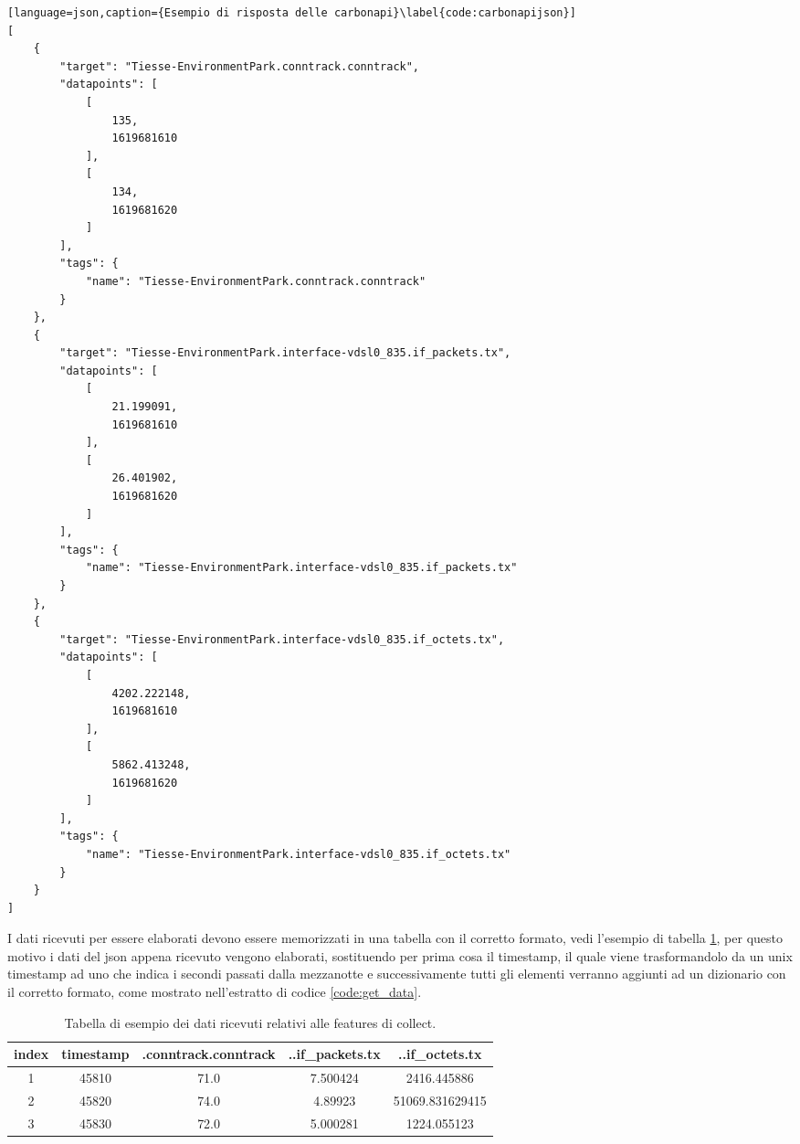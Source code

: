 \begin{lstlisting}[language=json,caption={Esempio di risposta delle carbonapi}\label{code:carbonapijson}]
[
    {
        "target": "Tiesse-EnvironmentPark.conntrack.conntrack",
        "datapoints": [
            [
                135,
                1619681610
            ],
            [
                134,
                1619681620
            ]
        ],
        "tags": {
            "name": "Tiesse-EnvironmentPark.conntrack.conntrack"
        }
    },
    {
        "target": "Tiesse-EnvironmentPark.interface-vdsl0_835.if_packets.tx",
        "datapoints": [
            [
                21.199091,
                1619681610
            ],
            [
                26.401902,
                1619681620
            ]
        ],
        "tags": {
            "name": "Tiesse-EnvironmentPark.interface-vdsl0_835.if_packets.tx"
        }
    },
    {
        "target": "Tiesse-EnvironmentPark.interface-vdsl0_835.if_octets.tx",
        "datapoints": [
            [
                4202.222148,
                1619681610
            ],
            [
                5862.413248,
                1619681620
            ]
        ],
        "tags": {
            "name": "Tiesse-EnvironmentPark.interface-vdsl0_835.if_octets.tx"
        }
    }
]
\end{lstlisting}
I dati ricevuti per essere elaborati devono essere memorizzati in una tabella con il corretto formato, vedi l'esempio di tabella \ref{table:tabella_dati_1}, per questo motivo i dati del json appena ricevuto vengono elaborati, sostituendo per prima cosa il timestamp, il quale viene trasformandolo da un unix timestamp ad uno che indica i secondi passati dalla mezzanotte e successivamente tutti gli elementi verranno aggiunti ad un dizionario con il corretto formato, come mostrato nell'estratto di codice \ref{code:get_data}.

\begin{table}[]

\begin{tabular}{||c c c c c||} 
\hline
index & timestamp  & .conntrack.conntrack & ..if\_packets.tx & ..if\_octets.tx \\ [0.5ex] 
\hline\hline
1 & 45810 & 71.0 & 7.500424 & 2416.445886 \\ 
\hline
2 & 45820 & 74.0 & 4.89923 & 51069.831629415 \\
\hline
3 & 45830 & 72.0 & 5.000281 & 1224.055123 \\
\hline
\end{tabular}
\caption{Tabella di esempio dei dati ricevuti relativi alle features di collect.}
\label{table:tabella_dati_1}
\end{table}

